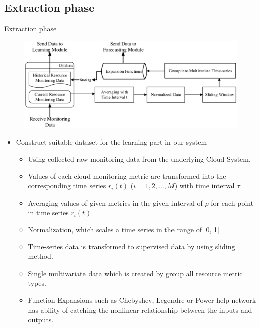 \documentclass{beamer}
\newcommand{\notesize}{\fontsize{8}{10}\selectfont}
\begin{document}
\subsection{Extraction phase}
\begin{frame}{Extraction phase}
	\begin{figure}
		\centering
		\includegraphics[width=0.75 \textwidth]{true/Extraction_Module.eps} %
		\label{fig:preprocessing}			
	\end{figure}
	\begin{itemize}
		\item{Construct suitable dataset for the learning part in our system }
		\begin{itemize}
			\item {\notesize Using collected raw monitoring data from the underlying Cloud System.}
			\item{\notesize Values of each cloud monitoring metric are transformed into the corresponding time series $r_i(t)$ ($i = 1, 2, \ldots, M$) with time interval $\tau$}
			\item{\notesize Averaging values of given metrics in the given interval of $\rho$ for each point in time series $r_i(t)$}
			\vspace{0.2cm}
			\item{\notesize Normalization, which scales a time series in the range of [0, 1]}
			\vspace{0.2cm}
			\item{\notesize Time-series data is transformed to supervised data by using sliding method.}
			\vspace{0.2cm}
			\item{\notesize Single multivariate data which is created by group all resource metric types.}
			\vspace{0.2cm}
			\item{\notesize Function Expansions such as Chebyshev, Legendre or Power help network has ability of catching the nonlinear relationship between the inputs and outputs.}
		\end{itemize}
	\end{itemize}
\end{frame}
\end{document}
